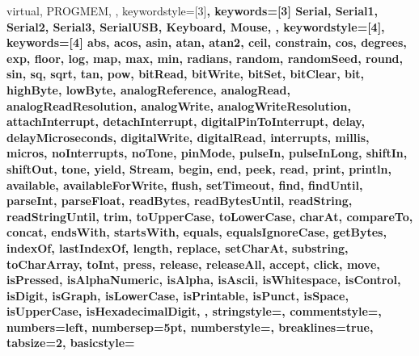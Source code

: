 {{                 virtual, PROGMEM,
                 },  
   keywordstyle=[3]\bfseries\color{arduinoOrange},
   keywords=[3]{  %
                 Serial, Serial1, Serial2, Serial3, SerialUSB, Keyboard, Mouse,
                 },      
   keywordstyle=[4]\color{arduinoOrange},
   keywords=[4]{  %
                 abs, acos, asin, atan, atan2, ceil, constrain, cos, degrees, exp, 
                 floor, log, map, max, min, radians, random, randomSeed, round, sin, 
                 sq, sqrt, tan, pow, bitRead, bitWrite, bitSet, bitClear, bit, 
                 highByte, lowByte, analogReference, analogRead, 
                 analogReadResolution, analogWrite, analogWriteResolution, 
                 attachInterrupt, detachInterrupt, digitalPinToInterrupt, delay, 
                 delayMicroseconds, digitalWrite, digitalRead, interrupts, millis, 
                 micros, noInterrupts, noTone, pinMode, pulseIn, pulseInLong, shiftIn, 
                 shiftOut, tone, yield, Stream, begin, end, peek, read, print, 
                 println, available, availableForWrite, flush, setTimeout, find, 
                 findUntil, parseInt, parseFloat, readBytes, readBytesUntil, readString, 
                 readStringUntil, trim, toUpperCase, toLowerCase, charAt, compareTo, 
                 concat, endsWith, startsWith, equals, equalsIgnoreCase, getBytes, 
                 indexOf, lastIndexOf, length, replace, setCharAt, substring, 
                 toCharArray, toInt, press, release, releaseAll, accept, click, move, 
                 isPressed, isAlphaNumeric, isAlpha, isAscii, isWhitespace, isControl, 
                 isDigit, isGraph, isLowerCase, isPrintable, isPunct, isSpace, 
                 isUpperCase, isHexadecimalDigit, 
                 },      
   stringstyle=\color{arduinoDarkBlue},    
   commentstyle=\color{arduinoGrey},    
   numbers=left,                    
   numbersep=5pt,                   
   numberstyle=\color{arduinoGrey},    
   breaklines=true,                    %
   tabsize=2,         
   basicstyle=\ttfamily  
 }